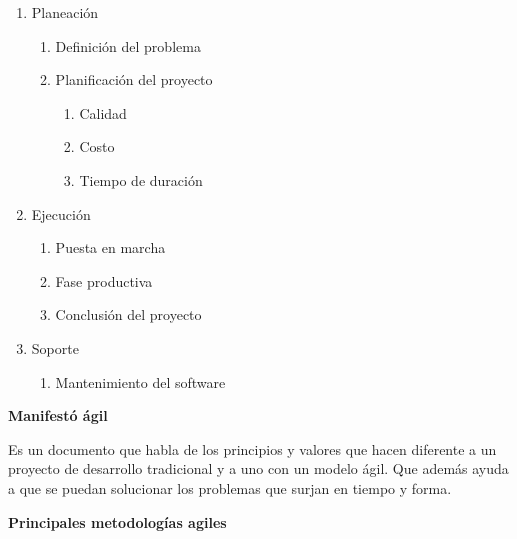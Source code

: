 \documentclass{article} %
\begin{document}
\begin{enumerate}
\item \textbf{ }Planeaci\'{o}n

\begin{enumerate}
\item  Definici\'{o}n del problema

\item  Planificaci\'{o}n del proyecto

\begin{enumerate}
\item  Calidad

\item  Costo

\item  Tiempo de duraci\'{o}n
\end{enumerate}
\end{enumerate}

\item  Ejecuci\'{o}n

\begin{enumerate}
\item  Puesta en marcha

\item  Fase productiva

\item  Conclusi\'{o}n del proyecto
\end{enumerate}

\item  Soporte

\begin{enumerate}
\item  Mantenimiento del software
\end{enumerate}
\end{enumerate}

\noindent \textbf{Manifest\'{o} \'{a}gil}

\noindent Es un documento que habla de los principios y valores que hacen diferente a un proyecto de desarrollo tradicional y a uno con un modelo \'{a}gil. Que adem\'{a}s ayuda a que se puedan solucionar los problemas que surjan en tiempo y forma.

\noindent \textbf{Principales metodolog\'{i}as agiles }
\end{document}
